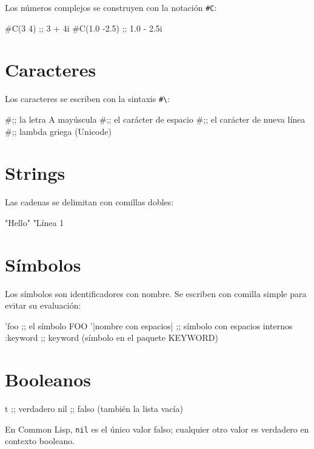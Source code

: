 Los números complejos se construyen con la notación \texttt{\#C}:

\begin{lispcode}
#C(3 4)       ;; 3 + 4i
#C(1.0 -2.5)  ;; 1.0 - 2.5i
\end{lispcode}

\section{Caracteres}

Los caracteres se escriben con la sintaxis \texttt{\#\textbackslash}:

\begin{lispcode}
#\A          ;; la letra A mayúscula
#\Space      ;; el carácter de espacio
#\Newline    ;; el carácter de nueva línea
#\λ          ;; lambda griega (Unicode)
\end{lispcode}

\section{Strings}

Las cadenas se delimitan con comillas dobles:

\begin{lispcode}
"Hello"
"Línea 1~%
\end{lispcode}

\section{Símbolos}

Los símbolos son identificadores con nombre. Se escriben con comilla simple
para evitar su evaluación:

\begin{lispcode}
'foo                      ;; el símbolo FOO
'|nombre con espacios|    ;; símbolo con espacios internos
:keyword                  ;; keyword (símbolo en el paquete KEYWORD)
\end{lispcode}

\section{Booleanos}

\begin{lispcode}
t    ;; verdadero
nil  ;; falso (también la lista vacía)
\end{lispcode}

En Common Lisp, \texttt{nil} es el único valor falso; cualquier otro valor es
verdadero en contexto booleano.

